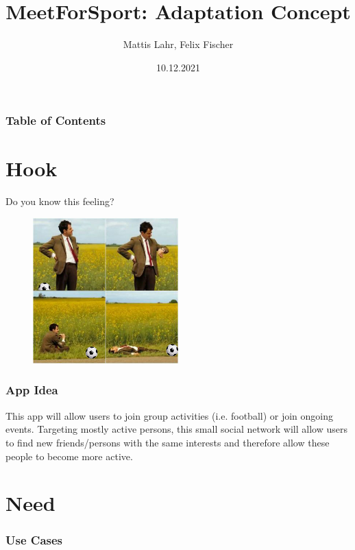 \documentclass[aspectratio=169]{beamer}
\title{MeetForSport: Adaptation Concept}
\author{Mattis Lahr, Felix Fischer}
\date{10.12.2021}
\begin{document}
\maketitle



\begin{frame}
    \frametitle{Table of Contents}
    \tableofcontents
\end{frame}



\section{Hook}

\begin{frame}
Do you know this feeling?
 \begin{figure}
		\centering
			\includegraphics[width=0.5\textwidth]{media/bean.jpg}
		\end{figure}
\end{frame}



\begin{frame}
\frametitle{App Idea}
This app will allow users to join group activities (i.e. football) or join ongoing events.
Targeting mostly active persons, this small social network will allow users  to find new friends/persons with the same interests and therefore allow these people to become more active.
\end{frame}

\section{Need}
	\begin{frame}
		\frametitle{Use Cases}
	\end{frame}
\end{document}
